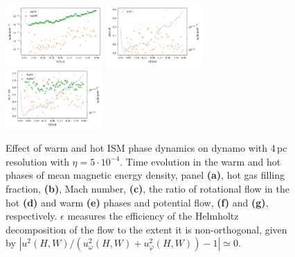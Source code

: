 \documentclass[iop,apj,numberedappendix,twocolappendix]{emulateapj}
\begin{document}


\begin{figure}
\centering
\includegraphics[trim=0.0cm 0.0cm 0.0cm 0.0cm,clip=true,width=0.33\textwidth]{csc_figs/efrac_hot-1e4K_pb4pcPm0e-3_3.png}
\includegraphics[trim=0.0cm 0.0cm 0.0cm 0.0cm,clip=true,width=0.33\textwidth]{csc_figs/efrac_hot-1e4K_fV4pcPm0e-3_3.png}
\includegraphics[trim=0.0cm 0.0cm 0.0cm 0.0cm,clip=true,width=0.33\textwidth]{csc_figs/efrac_hot-1e4K_Ma4pcPm0e-3_3.png}
\caption{
Effect of warm and hot ISM phase dynamics on dynamo with 4\,pc resolution with
$\eta=5\cdot10^{-4}$.
Time evolution in the warm and hot phases of mean magnetic energy density,
panel {\bf{(a)}}, hot gas filling fraction, {\bf{(b)}},
Mach number, {\bf{(c)}}, the ratio of rotational flow in the
hot {\bf{(d)}} and warm {\bf{(e)}} phases and potential flow, {\bf{(f)}} and
{\bf{(g)}}, respectively.
$\epsilon$ measures the efficiency of the Helmholtz decomposition
of the flow to the extent it is non-orthogonal, given by 
$|u^2(H,W)/(u^2_\omega(H,W)+u^2_\varphi(H,W))-1|\simeq0$.
\label{fig:4pc-phases}
}
\end{figure}
\end{document}
